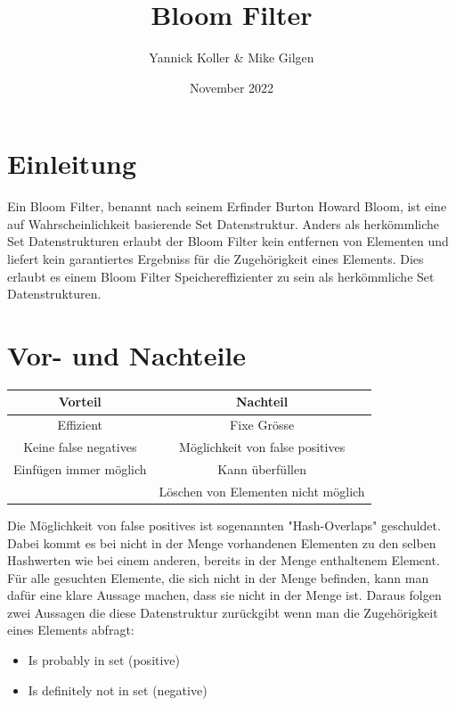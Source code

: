 \documentclass{article}
\title{Bloom Filter}
\author{ Yannick Koller & Mike Gilgen }
\date{November 2022}
\begin{document}
    \maketitle

    \section{Einleitung}
    Ein Bloom Filter, benannt nach seinem Erfinder Burton Howard Bloom, ist eine auf Wahrscheinlichkeit basierende Set Datenstruktur. Anders als herkömmliche Set Datenstrukturen erlaubt der Bloom Filter kein entfernen von Elementen und liefert kein garantiertes Ergebniss für die Zugehörigkeit eines Elements. Dies erlaubt es einem Bloom Filter Speichereffizienter zu sein als herkömmliche Set Datenstrukturen.


    \section{Vor- und Nachteile}
    \begin{center}
        \begin{tabular}{c|c}
            Vorteil                & Nachteil                            \\
            \hline
            Effizient              & Fixe Grösse                         \\
            Keine false negatives  & Möglichkeit von false positives     \\
            Einfügen immer möglich & Kann überfüllen                     \\
            & Löschen von Elementen nicht möglich \\
        \end{tabular}
    \end{center}
    Die Möglichkeit von false positives ist sogenannten "Hash-Overlaps" geschuldet. Dabei kommt es bei nicht in der Menge vorhandenen Elementen zu den selben Hashwerten wie bei einem anderen, bereits in der Menge enthaltenem Element. Für alle gesuchten Elemente, die sich nicht in der Menge befinden, kann man dafür eine klare Aussage machen, dass sie nicht in der Menge ist. Daraus folgen zwei Aussagen die diese Datenstruktur zurückgibt wenn man die Zugehörigkeit eines Elements abfragt:

    \begin{itemize}
        \item Is probably in set (positive)
        \item Is definitely not in set (negative)
    \end{itemize}
\end{document}
